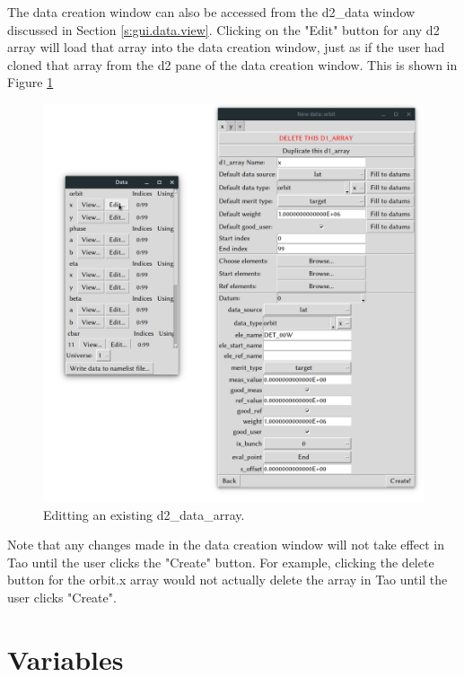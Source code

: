 The data creation window can also be accessed from the d2_data window discussed in Section \ref{s:gui.data.view}.
Clicking on the "Edit" button for any d2 array will load that array into the data creation window, just as if the user had cloned that array from the d2 pane of the data creation window.
This is shown in Figure \ref{fig:gui.edit.data}
\begin{figure}
\centering
\includegraphics[width=12cm]{figures/edit_data.png}
\caption{Editting an existing d2_data_array.}
\label{fig:gui.edit.data}
\end{figure}
Note that any changes made in the data creation window will not take effect in Tao until the user clicks the "Create" button.
For example, clicking the delete button for the orbit.x array would not actually delete the array in Tao until the user clicks "Create".

\section{Variables}
\label{s:gui.variables}

